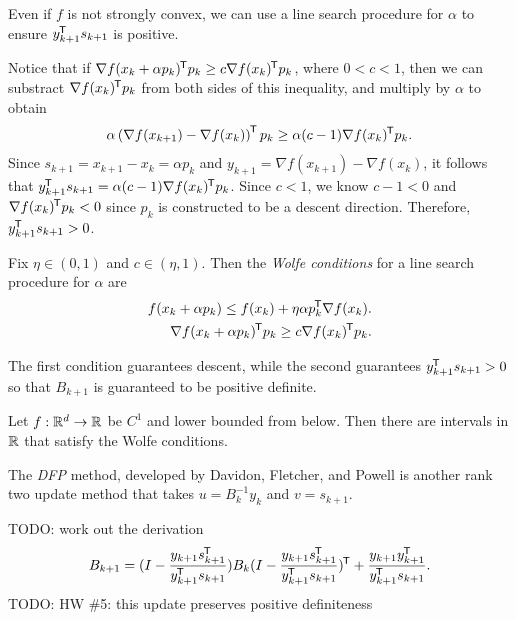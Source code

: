 \begin{rmk}
    Even if $f$ is not strongly convex, we can use a line search procedure for $\alpha$ to ensure $y_{k+1}^{\mkern-1.5mu\mathsf{T}}s_{k+1}$ is positive.

    Notice that if $\nabla f(x_{k}+\alpha p_{k})^{\mkern-1.5mu\mathsf{T}}p_k \geq c\nabla f(x_{k})^{\mkern-1.5mu\mathsf{T}}p_k$, where $0 < c < 1$, then we can substract $\nabla f(x_k)^{\mkern-1.5mu\mathsf{T}}p_k$ from both sides of this inequality, and multiply by $\alpha$ to obtain
    \begin{align*}
        \alpha\left(\nabla f(x_{k+1})-\nabla f(x_k)\right)^{\mkern-1.5mu\mathsf{T}}p_k \geq \alpha (c-1)\nabla f(x_k)^{\mkern-1.5mu\mathsf{T}}p_k.
    \end{align*}
    Since $s_{k+1} = x_{k+1}-x_k = \alpha p_k$ and $y_{k+1} = \nabla f(x_{k+1})-\nabla f(x_k)$, it follows that $y_{k+1}^{\mkern-1.5mu\mathsf{T}}s_{k+1} = \alpha (c-1)\nabla f(x_k)^{\mkern-1.5mu\mathsf{T}}p_k$. Since $c < 1$, we know $c-1 < 0$ and $\nabla f(x_k)^{\mkern-1.5mu\mathsf{T}}p_k < 0$ since $p_k$ is constructed to be a descent direction. Therefore, $y_{k+1}^{\mkern-1.5mu\mathsf{T}}s_{k+1} > 0$.
\end{rmk}

\begin{defn}
    Fix $\eta \in (0, 1)$ and $c \in (\eta, 1)$. Then the \emph{Wolfe conditions} for a line search procedure for $\alpha$ are
    \begin{align*}
        f(x_k + \alpha p_k) \leq f(x_k) + \eta\alpha p_{k}^{\mkern-1.5mu\mathsf{T}}\nabla f(x_k). \\
        \nabla f(x_k + \alpha p_k)^{\mkern-1.5mu\mathsf{T}}p_k \geq c\nabla f(x_k)^{\mkern-1.5mu\mathsf{T}}p_k.
    \end{align*}
\end{defn}

\begin{rmk}
    The first condition guarantees descent, while the second guarantees $y_{k+1}^{\mkern-1.5mu\mathsf{T}}s_{k+1} > 0$ so that $B_{k+1}$ is guaranteed to be positive definite.
\end{rmk}

\begin{lemma}
    Let $f: \mathbb{R}^d \to \mathbb{R}$ be $C^1$ and lower bounded from below. Then there are intervals in $\mathbb{R}$ that satisfy the Wolfe conditions.
\end{lemma}

\begin{defn}
    The \emph{DFP} method, developed by Davidon, Fletcher, and Powell is another rank two update method that takes $u = B_k^{-1}y_k$ and $v = s_{k+1}$.

    {\color{red}\Large TODO: work out the derivation}
    \begin{align*}
        B_{k+1} = (I - \frac{y_{k+1}s_{k+1}^{\mkern-1.5mu\mathsf{T}}}{y_{k+1}^{\mkern-1.5mu\mathsf{T}}s_{k+1}})B_k(I - \frac{y_{k+1}s_{k+1}^{\mkern-1.5mu\mathsf{T}}}{y_{k+1}^{\mkern-1.5mu\mathsf{T}}s_{k+1}})^{\mkern-1.5mu\mathsf{T}} + \frac{y_{k+1}y_{k+1}^{\mkern-1.5mu\mathsf{T}}}{y_{k+1}^{\mkern-1.5mu\mathsf{T}}s_{k+1}}.
    \end{align*}
    {\color{red}\Large TODO: HW \#5: this update preserves positive definiteness}
\end{defn}

